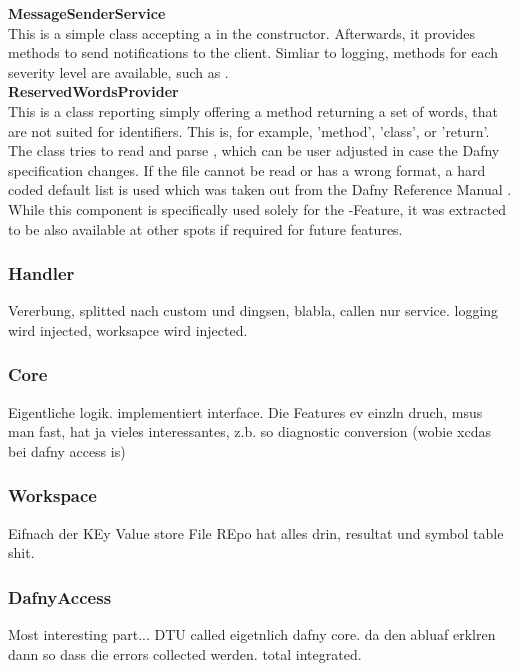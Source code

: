 \textbf{MessageSenderService}\\
This is a simple class accepting a  in the constructor. Afterwards, it provides methods to send notifications to the client. Simliar to logging, methods for each severity level are available, such as .\\

\textbf{ReservedWordsProvider}\\
This is a class reporting simply offering a method returning a set of words, that are not suited for identifiers. This is, for example, 'method', 'class', or 'return'. The class tries to read and parse , which can be user adjusted in case the Dafny specification changes. If the file cannot be read or has a wrong format, a hard coded default list is used which was taken out from the Dafny Reference Manual \cite{dafnyReferenceManual}.\\

While this component is specifically used solely for the -Feature, it was extracted to be also available at other spots if required for future features.\\

\subsubsection{Handler}
Vererbung, splitted nach custom und dingsen, blabla, callen nur service.
logging wird injected, worksapce wird injected.

\subsubsection{Core}
Eigentliche logik. implementiert interface. Die Features ev einzln druch, msus man fast, hat ja vieles interessantes, z.b. so diagnostic conversion (wobie xcdas bei dafny access is)

\subsubsection{Workspace}
Eifnach der KEy Value store
File REpo hat alles drin, resultat und symbol table shit.

\subsubsection{DafnyAccess}
Most interesting part...
DTU called eigetnlich dafny core.
da den abluaf erklren
dann so dass die errors collected werden.
total integrated.

